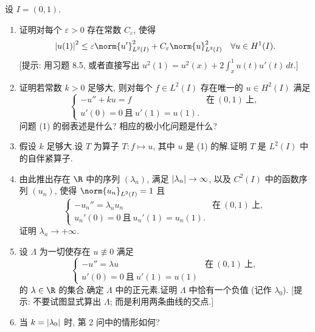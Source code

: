 \begin{exercise}
\label{exer:8.24}
设 $I=(0,1)$.
\begin{enumerate}[label=\arabic*., leftmargin=2.2em, itemsep=0.3em]
	\item 证明对每个 $\varepsilon>0$ 存在常数 $C_\varepsilon$, 使得
	      \begin{equation*}
	      \abs{u(1)}^2\le\varepsilon\norm{u'}_{L^2(I)}^2
	      +C_\varepsilon\norm{u}_{L^2(I)}^2\quad\forall u\in H^1(I).
	      \end{equation*}
	      [提示: 用习题 8.5, 或者直接写出
	      $u^2(1)=u^2(x)+2\int_x^1u(t)u'(t)\,dt$.]
	\item 证明若常数 $k>0$ 足够大, 则对每个 $f\in L^2(I)$ 存在唯一的
	      $u\in H^2(I)$ 满足
	      \begin{equation}
	      \begin{cases}
	      -u''+ku=f & \text{在}\ (0,1)\ \text{上},\\
	      u'(0)=0\ \text{且}\ u'(1)=u(1).
	      \end{cases}
	      \tag{1}
	      \end{equation}
	      问题 (1) 的弱表述是什么? 相应的极小化问题是什么?
	\item 假设 $k$ 足够大.设 $T$ 为算子 $T:f\mapsto u$, 其中 $u$ 是 (1)
	      的解.证明 $T$ 是 $L^2(I)$ 中的自伴紧算子.
	\item 由此推出存在 $\R$ 中的序列 $(\lambda_n)$, 满足
	      $\left|\lambda_n\right|\to\infty$, 以及 $C^2(I)$ 中的函数序列 $(u_n)$,
	      使得 $\norm{u_n}_{L^2(I)}=1$ 且
	      \begin{equation*}
	      \begin{cases}
	      -u_n''=\lambda_nu_n & \text{在}\ (0,1)\ \text{上},\\
	      u_n'(0)=0\ \text{且}\ u_n'(1)=u_n(1).
	      \end{cases}
	      \end{equation*}
	      证明 $\lambda_n\to+\infty$.
	\item 设 $\Lambda$ 为一切使存在 $u\not\equiv0$ 满足
	      \begin{equation*}
	      \begin{cases}
	      -u''=\lambda u & \text{在}\ (0,1)\ \text{上},\\
	      u'(0)=0\ \text{且}\ u'(1)=u(1)
	      \end{cases}
	      \end{equation*}
	      的 $\lambda\in\R$ 的集合.确定 $\Lambda$ 中的正元素.证明 $\Lambda$
	      中恰有一个负值 (记作 $\lambda_0$).
	      [提示: 不要试图显式算出 $\Lambda$; 而是利用两条曲线的交点.]
	\item 当 $k=\left|\lambda_0\right|$ 时, 第 2 问中的情形如何?
\end{enumerate}
\end{exercise}

